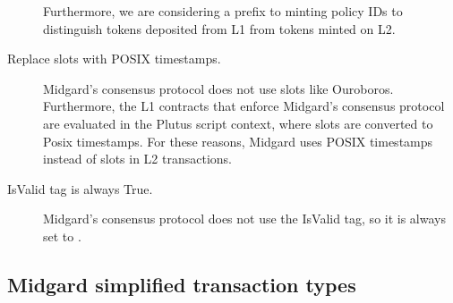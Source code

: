\documentclass[../midgard.tex]{subfiles}
\begin{document}
\begin{description}
      Furthermore, we are considering a prefix to minting policy IDs to distinguish tokens deposited from L1 from tokens minted on L2.
    \item[Replace slots with POSIX timestamps.] Midgard's consensus protocol does not use slots like Ouroboros.
      Furthermore, the L1 contracts that enforce Midgard's consensus protocol are evaluated in the Plutus script context, where slots are converted to Posix timestamps.
      For these reasons, Midgard uses POSIX timestamps instead of slots in L2 transactions.
    \item[IsValid tag is always True.] Midgard's consensus protocol does not use the IsValid tag, so it is always set to .
\end{description}

\subsection{Midgard simplified transaction types}
\label{h:midgard-simplified-transaction-types}
\end{document}
